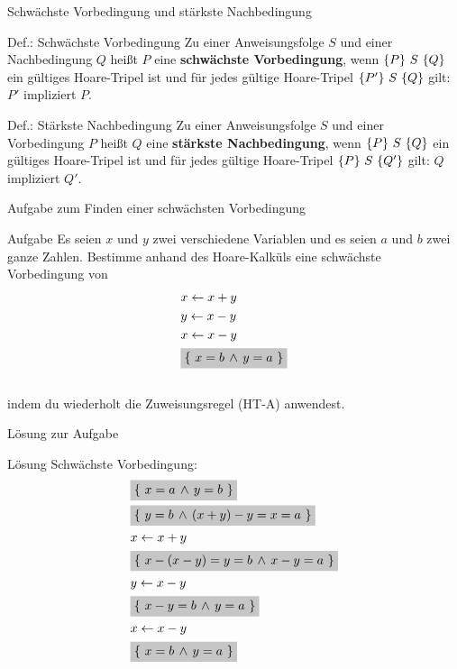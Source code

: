 \begin{frame}{Schwächste Vorbedingung und stärkste Nachbedingung}
	\begin{block}{Def.: Schwächste Vorbedingung}
		Zu einer Anweisungsfolge $S$ und einer Nachbedingung $Q$ heißt $P$ eine \textbf{schwächste Vorbedingung}, wenn $\left\{ P \right\} \, S \, \left\{ Q \right\}$ ein gültiges Hoare-Tripel ist und für jedes gültige Hoare-Tripel $\left\{ P' \right\} \, S \, \left\{ Q \right\}$ gilt: $P'$ impliziert $P$.
	\end{block}

	\begin{block}{Def.: Stärkste Nachbedingung}
		Zu einer Anweisungsfolge $S$ und einer Vorbedingung $P$ heißt $Q$ eine \textbf{stärkste Nachbedingung}, wenn $\left\{ P \right\} \, S \, \left\{ Q \right\}$ ein gültiges Hoare-Tripel ist und für jedes gültige Hoare-Tripel $\left\{ P \right\} \, S \, \left\{ Q' \right\}$ gilt: $Q$ impliziert $Q'$.
	\end{block}
\end{frame}

\begin{frame}{Aufgabe zum Finden einer schwächsten Vorbedingung}
	\begin{exampleblock}{Aufgabe}
		Es seien $x$ und $y$ zwei verschiedene Variablen und es seien $a$ und $b$ zwei ganze
		Zahlen. Bestimme anhand des Hoare-Kalküls eine schwächste Vorbedingung von
		\begin{align*}
			& x \leftarrow x+y\\
			& y \leftarrow x-y\\
			& x \leftarrow x-y\\
			& \HTB{$x=b \, \wedge \, y=a$}
		\end{align*}
		\\[18pt]
		indem du wiederholt die Zuweisungsregel (HT-A) anwendest.
			
	\end{exampleblock}
\end{frame}

\begin{frame}{Lösung zur Aufgabe}
	\begin{block}{Lösung}
		Schwächste Vorbedingung: \\
		\begin{align*}
			&\HTB{$x=a \, \wedge \, y=b$}\\
			&\HTB{$y=b \, \wedge \, (x+y)-y=x=a$}\\
			& x \leftarrow x+y\\
			&\HTB{$x-(x-y)=y=b \, \wedge \, x-y=a$}\\
			& y \leftarrow x-y\\
			&\HTB{$x-y=b \, \wedge \, y=a$}\\
			& x \leftarrow x-y\\
			&\HTB{$x=b \, \wedge \, y=a$}
		\end{align*}
	\end{block}
\end{frame}


